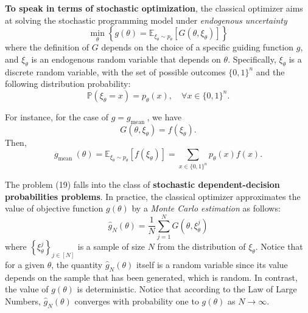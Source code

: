 \textbf{To speak in terms of stochastic optimization}, the classical optimizer aims at solving the stochastic programming model under \textit{endogenous uncertainty} 
\begin{equation}
    \min _{\theta}\left\{g(\theta)=\mathbb{E}_{\xi_{\theta} \sim p_{\theta}}\left[G\left(\theta, \xi_{\theta}\right)\right]\right\} \tag{19}
\end{equation}
where the definition of $G$ depends on the choice of a specific guiding function $g$, and $\xi_{\theta}$ is an endogenous random variable that depends on $\theta$. Specifically, $\xi_{\theta}$ is a discrete random variable, with the set of possible outcomes $\{0,1\}^{n}$ and the following distribution probability:
\begin{equation}
    \mathbb{P}\left(\xi_{\theta}=x\right)=p_{\theta}(x), \quad \forall x \in\{0,1\}^{n}.
\end{equation}
\begin{example}
    For instance, for the case of $g=g_{\text {mean }}$, we have
\begin{equation}
    G\left(\theta, \xi_{\theta}\right)=f\left(\xi_{\theta}\right).
\end{equation}
Then, 
\begin{equation}
    g_{\text {mean }}(\theta)
=\mathbb{E}_{\xi_{\theta} \sim p_{\theta}}\left[f\left(\xi_{\theta}\right)\right]
=\sum_{x \in\{0,1\}^{n}} p_{\theta}(x) f(x).
\end{equation}
\end{example}


The problem (19) falls into the class of \textbf{stochastic dependent-decision probabilities problems}. %
In practice, the classical optimizer approximates the value of objective function $g(\theta)$ by a \textit{Monte Carlo estimation} as follows:
\begin{equation}
    \hat{g}_{N}(\theta)=\frac{1}{N} \sum_{j=1}^{N} G\left(\theta, \xi_{\theta}^{j}\right)
\end{equation}
where $\left\{\xi_{\theta}^{j}\right\}_{j \in[N]}$ is a sample of size $N$ from the distribution of $\xi_{\theta}$. Notice that for a given $\theta$, the quantity $\hat{g}_{N}(\theta)$ itself is a random variable since its value depends on the sample that has been generated, which is random. In contrast, the value of $g(\theta)$ is deterministic. Notice that according to the Law of Large Numbers, $\hat{g}_{N}(\theta)$ converges with probability one to $g(\theta)$ as $N \rightarrow \infty$.

